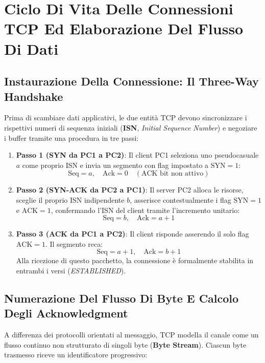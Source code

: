 \documentclass[11pt, a4paper]{article}
\begin{document}
\newpage

\section{Ciclo Di Vita Delle Connessioni TCP Ed Elaborazione Del Flusso Di Dati}

\subsection{Instaurazione Della Connessione: Il Three-Way Handshake}

Prima di scambiare dati applicativi, le due entità TCP devono sincronizzare i rispettivi numeri di sequenza iniziali (\textbf{ISN}, \emph{Initial Sequence Number}) e negoziare i buffer tramite una procedura in tre passi:


\begin{enumerate}
    \item \textbf{Passo 1 (SYN da PC1 a PC2)}:
    Il client PC1 seleziona uno pseudocasuale $a$ come proprio ISN e invia un segmento con flag impostato a $\text{SYN}=1$:
    \[
        \text{Seq} = a, \quad \text{Ack} = 0 \quad (\text{ACK bit non attivo})
    \]

    \item \textbf{Passo 2 (SYN-ACK da PC2 a PC1)}:
    Il server PC2 alloca le risorse, sceglie il proprio ISN indipendente $b$, asserisce contestualmente i flag $\text{SYN}=1$ e $\text{ACK}=1$, confermando l'ISN del client tramite l'incremento unitario:
    \[
        \text{Seq} = b, \quad \text{Ack} = a + 1
    \]

    \item \textbf{Passo 3 (ACK da PC1 a PC2)}:
    Il client risponde asserendo il solo flag $\text{ACK}=1$. Il segmento reca:
    \[
        \text{Seq} = a + 1, \quad \text{Ack} = b + 1
    \]
    Alla ricezione di questo pacchetto, la connessione è formalmente stabilita in entrambi i versi (\emph{ESTABLISHED}).
\end{enumerate}

\subsection{Numerazione Del Flusso Di Byte E Calcolo Degli Acknowledgment}

A differenza dei protocolli orientati al messaggio, TCP modella il canale come un flusso continuo non strutturato di singoli byte (\textbf{Byte Stream}). Ciascun byte trasmesso riceve un identificatore progressivo:
\end{document}

